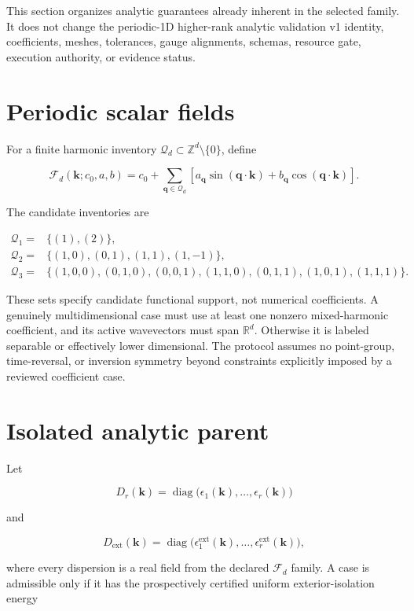 \documentclass[11pt]{article}
\begin{document}
This section organizes analytic guarantees already inherent in the selected family. It
does not change the periodic-1D higher-rank analytic validation v1 identity, coefficients, meshes, tolerances, gauge alignments, schemas,
resource gate, execution authority, or evidence status.

\section{Periodic scalar fields}

For a finite harmonic inventory $\mathcal Q_d\subset\mathbb Z^d\setminus\{0\}$, define

\[
\mathcal F_d(\mathbf k;c_0,a,b)
=c_0+\sum_{\mathbf q\in\mathcal Q_d}
\left[
 a_{\mathbf q}\sin(\mathbf q\cdot\mathbf k)
 +b_{\mathbf q}\cos(\mathbf q\cdot\mathbf k)
\right].
\]

The candidate inventories are

\[
\begin{aligned}
\mathcal Q_1={}&\{(1),(2)\},\\
\mathcal Q_2={}&\{(1,0),(0,1),(1,1),(1,-1)\},\\
\mathcal Q_3={}&\{(1,0,0),(0,1,0),(0,0,1),
(1,1,0),(0,1,1),(1,0,1),(1,1,1)\}.
\end{aligned}
\]

These sets specify candidate functional support, not numerical coefficients. A genuinely
multidimensional case must use at least one nonzero mixed-harmonic coefficient, and its
active wavevectors must span $\mathbb R^d$. Otherwise it is labeled separable or
effectively lower dimensional. The protocol assumes no point-group, time-reversal, or
inversion symmetry beyond constraints explicitly imposed by a reviewed coefficient
case.

\section{Isolated analytic parent}

Let

\[
D_r(\mathbf k)=\operatorname{diag}
\bigl(\epsilon_1(\mathbf k),\ldots,\epsilon_r(\mathbf k)\bigr)
\]

and

\[
D_{\mathrm{ext}}(\mathbf k)=\operatorname{diag}
\bigl(\epsilon^{\mathrm{ext}}_1(\mathbf k),\ldots,
\epsilon^{\mathrm{ext}}_r(\mathbf k)\bigr),
\]

where every dispersion is a real field from the declared $\mathcal F_d$ family. A case
is admissible only if it has the prospectively certified uniform exterior-isolation
energy
\end{document}
